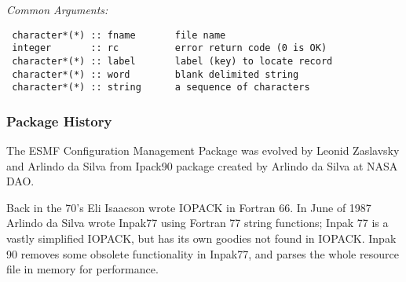  {\em Common Arguments:}

 \begin{verbatim}
 character*(*) :: fname       file name
 integer       :: rc          error return code (0 is OK)
 character*(*) :: label       label (key) to locate record
 character*(*) :: word        blank delimited string
 character*(*) :: string      a sequence of characters
 \end{verbatim}


    \subsubsection{Package History}
       The ESMF Configuration Management Package was evolved by 
       Leonid Zaslavsky and Arlindo da Silva from Ipack90 package
       created by Arlindo da Silva at NASA DAO.

       Back in the 70's Eli Isaacson wrote IOPACK in Fortran
       66.  In June of 1987 Arlindo da Silva wrote Inpak77 using
       Fortran 77 string functions; Inpak 77 is a vastly
       simplified IOPACK, but has its own goodies not found in
       IOPACK.  Inpak 90 removes some obsolete functionality in
       Inpak77, and parses the whole resource file in memory for
       performance. 


